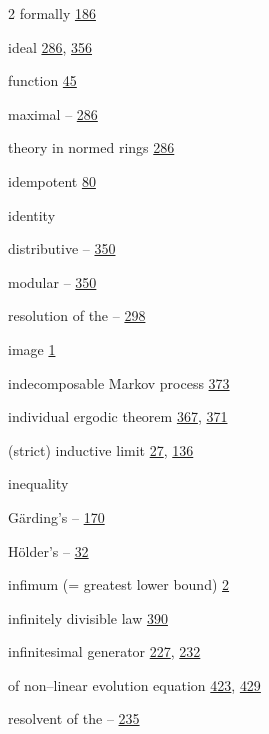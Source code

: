 \begin{multicols}{2}
\hspace*{1.1em}formally \hyperlink{page.186}{186}\par
\noindent ideal \hyperlink{page.286}{286}, \hyperlink{page.356}{356}\par
\hspace*{1.1em}function \hyperlink{page.45}{45}\par
\hspace*{1.1em}maximal -- \hyperlink{page.286}{286}\par
\hspace*{1.1em}theory in normed rings \hyperlink{page.286}{286}\par
\noindent idempotent \hyperlink{page.80}{80}\par
\noindent identity\par
\hspace*{1.1em}distributive -- \hyperlink{page.350}{350}\par
\hspace*{1.1em}modular -- \hyperlink{page.350}{350}\par
\hspace*{1.1em}resolution of the -- \hyperlink{page.298}{298}\par
\noindent image \hyperlink{page.1}{1}\par
\noindent indecomposable Markov process \hyperlink{page.373}{373}\par
\noindent individual ergodic theorem \hyperlink{page.367}{367}, \hyperlink{page.371}{371}\par
\noindent (strict) inductive limit \hyperlink{page.27}{27}, \hyperlink{page.136}{136}\par
\noindent inequality\par
\hspace*{1.1em}Gärding's -- \hyperlink{page.170}{170}\par
\hspace*{1.1em}Hölder's -- \hyperlink{page.32}{32}\par
\noindent infimum (= greatest lower bound) \hyperlink{page.2}{2}\par
\noindent infinitely divisible law \hyperlink{page.390}{390}\par
\noindent infinitesimal generator \hyperlink{page.227}{227}, \hyperlink{page.232}{232}\par
\hspace*{1.1em}of non--linear evolution equation \hyperlink{page.423}{423}, \hyperlink{page.429}{429}\par
\hspace*{1.1em}resolvent of the -- \hyperlink{page.235}{235}\par

\end{multicols}
